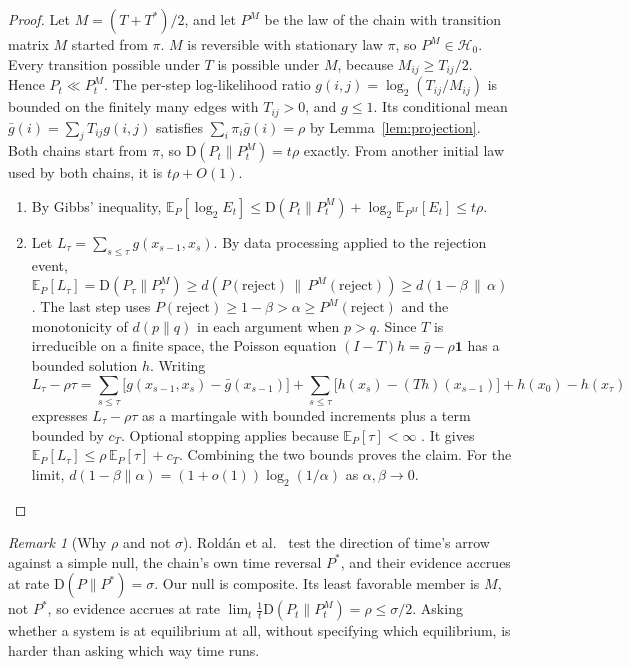 \documentclass[11pt]{article}
\theoremstyle{definition}
\theoremstyle{remark}
\newtheorem{remark}[theorem]{Remark}
\newcommand{\E}{\mathbb{E}}
\newcommand{\KL}{\mathrm{D}}
\newcommand{\Hnull}{\mathcal{H}_0}
\begin{document}
\begin{proof}
Let $M=(T+T^\ast)/2$, and let $P^M$ be the law of the chain with transition matrix $M$ started from $\pi$. $M$ is reversible with stationary law $\pi$, so $P^M\in\Hnull$. Every transition possible under $T$ is possible under $M$, because $M_{ij}\ge T_{ij}/2$. Hence $P_t\ll P^M_t$. The per-step log-likelihood ratio $g(i,j)=\log_2(T_{ij}/M_{ij})$ is bounded on the finitely many edges with $T_{ij}>0$, and $g\le1$. Its conditional mean $\bar g(i)=\sum_jT_{ij}g(i,j)$ satisfies $\sum_i\pi_i\bar g(i)=\rho$ by Lemma~\ref{lem:projection}. Both chains start from $\pi$, so $\KL(P_t\|P^M_t)=t\rho$ exactly. From another initial law used by both chains, it is $t\rho+O(1)$.
\begin{enumerate}[label=(\alph*),itemsep=0.1em]
\item By Gibbs' inequality, $\E_P[\log_2E_t]\le\KL(P_t\|P^M_t)+\log_2\E_{P^M}[E_t]\le t\rho$.
\item Let $L_\tau=\sum_{s\le\tau}g(x_{s-1},x_s)$. By data processing applied to the rejection event, $\E_P[L_\tau]=\KL(P_\tau\|P^M_\tau)\ge d(P(\text{reject})\,\|\,P^M(\text{reject}))\ge d(1-\beta\,\|\,\alpha)$. The last step uses $P(\text{reject})\ge1-\beta>\alpha\ge P^M(\text{reject})$ and the monotonicity of $d(p\|q)$ in each argument when $p>q$. Since $T$ is irreducible on a finite space, the Poisson equation $(I-T)h=\bar g-\rho\mathbf 1$ has a bounded solution $h$. Writing
\[
L_\tau-\rho\tau=\sum_{s\le\tau}\bigl[g(x_{s-1},x_s)-\bar g(x_{s-1})\bigr]+\sum_{s\le\tau}\bigl[h(x_s)-(Th)(x_{s-1})\bigr]+h(x_0)-h(x_\tau)
\]
expresses $L_\tau-\rho\tau$ as a martingale with bounded increments plus a term bounded by $c_T$. Optional stopping applies because $\E_P[\tau]<\infty$ \cite{fuhzhang2000}. It gives $\E_P[L_\tau]\le\rho\,\E_P[\tau]+c_T$. Combining the two bounds proves the claim. For the limit, $d(1-\beta\|\alpha)=(1+o(1))\log_2(1/\alpha)$ as $\alpha,\beta\to0$.\qedhere
\end{enumerate}
\end{proof}

\begin{remark}[Why $\rho$ and not $\sigma$]
Roldán et al.\ \cite{roldan2015} test the direction of time's arrow against a simple null, the chain's own time reversal $P^\ast$, and their evidence accrues at rate $\KL(P\|P^\ast)=\sigma$. Our null is composite. Its least favorable member is $M$, not $P^\ast$, so evidence accrues at rate $\lim_t\frac1t\KL(P_t\|P^M_t)=\rho\le\sigma/2$. Asking whether a system is at equilibrium at all, without specifying which equilibrium, is harder than asking which way time runs.
\end{remark}
\end{document}
